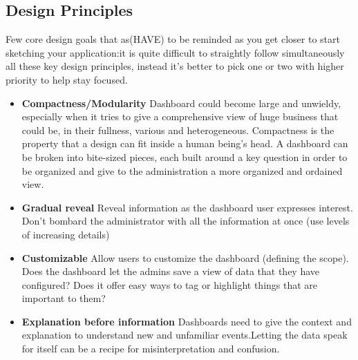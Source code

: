 \documentclass[a4paper,13pt]{report}
\begin{document}
\subsection{Design Principles}
Few core design goals that as(HAVE) to be reminded as you get closer to start sketching your application:it is quite difficult to straightly follow simultaneously all these key design principles, instead it's better to pick one or two with higher priority to help stay focused.
\begin{itemize}
    \item \textbf{Compactness/Modularity}\newline
    Dashboard could become large and unwieldy, especially when it tries to give a comprehensive view of huge business that could be, in their fullness, various and heterogeneous. Compactness is the property that a design can fit inside a human being's head.
    A dashboard can be broken into bite-sized pieces, each built around a key question in order to be organized and give to the administration a more organized and ordained view.
    \item \textbf{Gradual reveal}\newline
    Reveal information as the dashboard user expresses interest. Don't bombard the administrator with all the information at once (use levels of increasing details)
    \item \textbf{Customizable}\newline   
    Allow users to customize the dashboard (defining the scope). 
    Does the dashboard let the admins save a view of data that they have configured? \newline
    Does it offer easy ways to tag or highlight things that are important to them?
    \item \textbf{Explanation before information}\newline
    Dashboards need to give the context and explanation to understand new and unfamiliar events.Letting the data speak for itself can be a recipe for misinterpretation and confusion.
\end{itemize}
\end{document}
